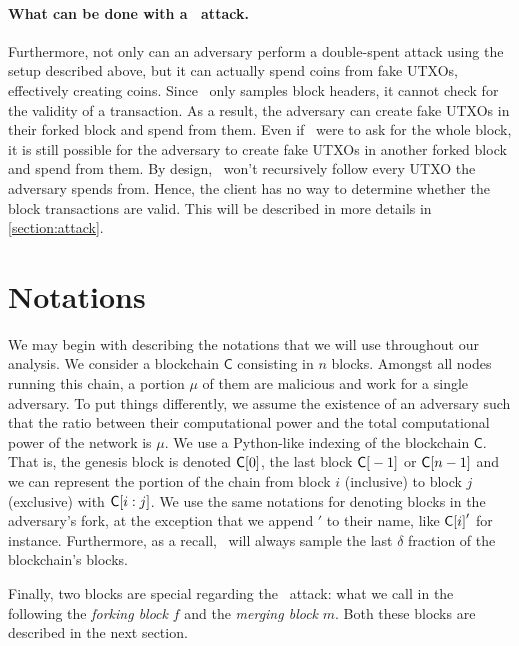       \paragraph{What can be done with a \cs\ attack.} Furthermore, not only can an adversary perform a double-spent attack using the setup described above, but it can actually spend coins from fake UTXOs, effectively creating coins. Since \FC\ only samples block headers, it cannot check for the validity of a transaction. As a result, the adversary can create fake UTXOs in their forked block and spend from them. Even if \FC\ were to ask for the whole block, it is still possible for the adversary to create fake UTXOs in another forked block and spend from them. By design, \FC\ won't recursively follow every UTXO the adversary spends from. Hence, the client has no way to determine whether the block transactions are valid. This will be described in more details in \autoref{section:attack}.
    \section{Notations}
      \label{section:notations}
      We may begin with describing the notations that we will use throughout our analysis. We consider a blockchain \(\mathsf{C}\) consisting in \(n\) blocks. Amongst all nodes running this chain, a portion \(\mu\) of them are malicious and work for a single adversary. To put things differently, we assume the existence of an adversary such that the ratio between their computational power and the total computational power of the network is \(\mu\). We use a Python-like indexing of the blockchain \(\mathsf{C}\). That is, the genesis block is denoted \(\mathsf{C[}0\mathsf{]}\), the last block \(\mathsf{C[}-1\mathsf{]}\) or \(\mathsf{C[}n-1\mathsf{]}\) and we can represent the portion of the chain from block  \(i\) (inclusive) to block \(j\) (exclusive) with  \(\mathsf{C[}i:j\mathsf{]}\). We use the same notations for denoting blocks in the adversary's fork, at the exception that we append \('\) to their name, like \(\mathsf{C[}i\mathsf{]}'\) for instance. Furthermore, as a recall, \FC\ will always sample the last \(\delta\) fraction of the blockchain's blocks.   

      Finally, two blocks are special regarding the \cs\ attack: what we call in the following the \emph{forking block} \(f\) and the \emph{merging block} \(m\). Both these blocks are described in the next section.

